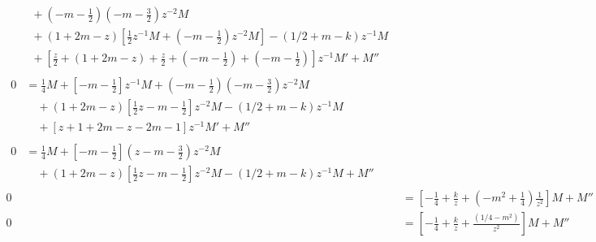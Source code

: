 \documentclass[a4paper,12pt, leqno, answers]{exam}
\begin{document}
\begin{questions}
\begin{solution}
\begin{align*}
\begin{split}
                &\quad {}+ \left( -m - \frac{1}{2} \right) \left( -m - \frac{3}{2} \right) z^{-2} M  \\
                &\quad {}+ (1 + 2 m - z) \left[ \frac{1}{2} z^{-1} M + \left( -m - \frac{1}{2} \right) z^{-2} M \right] - (1/2 + m - k) z^{-1} M \\
                &\quad {}+ \left[ \frac{z}{2} + (1 + 2 m - z) + \frac{z}{2} + \left( -m - \frac{1}{2} \right) + \left( -m - \frac{1}{2} \right) \right] z^{-1} M' + M''
            \end{split} \\
            \begin{split}
                0 &= \frac{1}{4} M + \left[ -m - \frac{1}{2} \right] z^{-1} M + \left( -m - \frac{1}{2} \right) \left( -m - \frac{3}{2} \right) z^{-2} M  \\
                &\quad {}+ (1 + 2 m - z) \left[ \frac{1}{2} z - m - \frac{1}{2} \right] z^{-2} M - (1/2 + m - k) z^{-1} M \\
                &\quad {}+ \left[ z + 1 + 2 m - z - 2m - 1 \right] z^{-1} M' + M''
            \end{split} \\
            \begin{split}
                0 &= \frac{1}{4} M + \left[ -m - \frac{1}{2} \right] \left( z - m - \frac{3}{2} \right) z^{-2} M  \\
                &\quad {}+ (1 + 2 m - z) \left[ \frac{1}{2} z - m - \frac{1}{2} \right] z^{-2} M - (1/2 + m - k) z^{-1} M + M''
            \end{split} \\
            0 &= \left[ -\frac{1}{4} + \frac{k}{z} + \left( -m^2 + \frac{1}{4} \right) \frac{1}{z^2} \right] M + M'' \\
            0 &= \left[ -\frac{1}{4} + \frac{k}{z} + \frac{(1/4 - m^2)}{z^2} \right] M + M'' \\
        \end{align*}
    \end{solution}


\end{questions}
\end{document}
